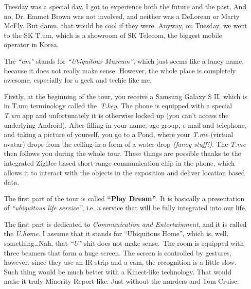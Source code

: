\begin{post}
	\begin{content}
Tuesday was a special day. I got to experience both the future and the past. And no, Dr. Emmet Brown was not involved, and neither was a DeLorean or Marty McFly. But damn, that would be cool if they were. Anyway, on Tuesday, we went to the SK T.um, which is a showroom of SK Telecom, the biggest mobile operator in Korea.

\begin{figure}
\vspace{-12pt}\centering{}
\vspace{-32pt}
\end{figure}The \textit{``um''} stands for \textit{``Ubiquitous Museum''}, which just seems like a fancy name, because it does not really make sense. However, the whole place is completely awesome, especially for a geek and techie like me.

Firstly, at the beginning of the tour, you receive a Samsung Galaxy S II, which is in T.um terminology called the \textit{T.key}. The phone is equipped with a special \textit{T.um} app and unfortunately it is otherwise locked up (you can't access the underlying Android). After filling in your name, age group, e-mail and telephone, and taking a picture of yourself, you go to a Pond, where your \textit{T.me} (virtual avatar) drops from the ceiling in a form of a water drop \textit{(fancy stuff!)}. The \textit{T.me} then follows you during the whole tour. These things are possible thanks to the integrated ZigBee based short-range communication chip in the phone, which allows it to interact with the objects in the exposition and deliver location based data.

The first part of the tour is called \textbf{``Play Dream''}. It is basically a presentation of \textit{``ubiquitous life service''}, i.e. a service that will be fully integrated into our life.

The first part is dedicated to \textit{Communication and Entertainment}, and it is called the \textit{U.home}. I assume that it stands for ``Ubiquitous Home'', which is, well, something{\ldots}Nah, that \textit{``U''} shit does not make sense. The room is equipped with three beamers that form a huge screen. The screen is controlled by gestures, however, since they use an IR strip and a cam, the recognition is a little slow. Such thing would be much better with a Kinect-like technology. That would make it truly Minority Report-like. Just without the murders and Tom Cruise.


\end{content}
\end{post}
